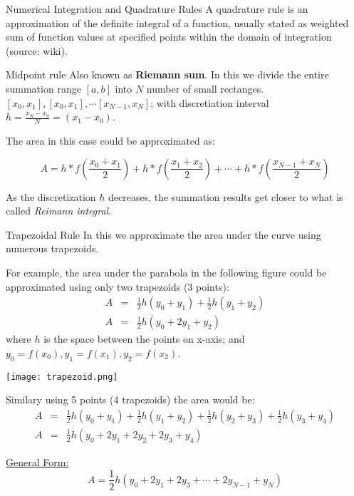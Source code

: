 \documentclass[11pt,titlepage,fleqn]{article}
\begin{document}
\begin{section}{Numerical Integration and Quadrature Rules}
A quadrature rule is an approximation of the definite integral of a function, usually stated as weighted sum of function values at specified points within the domain of integration (source: wiki).

\begin{subsection}{Midpoint rule}
Also known as {\bf Riemann sum}. In this we divide the entire summation range $[a,b]$ into $N$ number of small rectanges.$[x_0,x_1], [x_0,x_1], \cdots [x_{N-1},x_N]$; with discretiation interval $h = \frac{x_N - x_0}{N} = (x_1 - x_0)$.

The area in this case could be approximated as:

\begin{equation}
A = h * f(\frac{x_0 + x_1}{2}) + h * f(\frac{x_1 + x_2}{2}) + \cdots + h * f(\frac{x_{N-1} + x_N}{2})
\end{equation}

As the discretization $h$ decreases, the summation results get closer to what is called {\it Reimann integral}.

\end{subsection}

\begin{subsection}{Trapezoidal Rule}
In this we approximate the area under the curve using numerous trapezoids.

For example, the area under the parabola in the following figure could be approximated using only two trapezoids (3 points):
\begin{eqnarray}
A &=& \frac{1}{2} h (y_0 + y_1) + \frac{1}{2} h (y_1 + y_2)\\
A &=& \frac{1}{2} h (y_0 + 2 y_1 + y_2)
\end{eqnarray}
where $h$ is the space between the points on x-axis; and $y_0 = f(x_0), y_1
 = f(x_1), y_2 = f(x_2)$.

\texttt{[image: trapezoid.png]} \label{trap}

Similary using 5 points (4 trapezoids) the area would be:
\begin{eqnarray}
A &=& \frac{1}{2} h (y_0 + y_1) + \frac{1}{2} h (y_1 + y_2) + 
\frac{1}{2} h (y_2 + y_3) + \frac{1}{2} h (y_3 + y_4) \\
A &=& \frac{1}{2} h (y_0 + 2 y_1 + 2y_2 + 2y_3 + y_4)
\end{eqnarray}

\underline{General Form:} 
\begin{equation}
A = \frac{1}{2} h (y_0 + 2 y_1 + 2y_3 + \cdots + 2y_{N-1} + y_N)
\end{equation}
\end{subsection}


\end{section}
\end{document}
